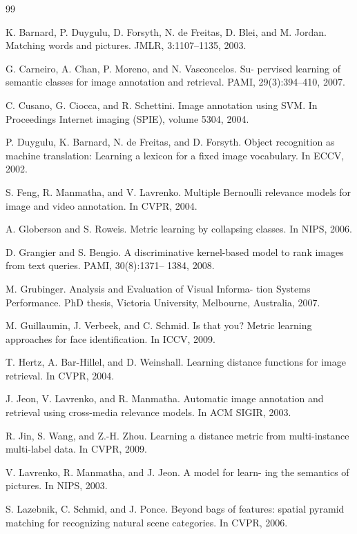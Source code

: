 \documentclass[a4paper,twocolumn]{ctexart}
\begin{document}
\begin{thebibliography} {99}

K. Barnard, P. Duygulu, D. Forsyth, N. de Freitas, D. Blei,
and M. Jordan. Matching words and pictures. JMLR,
3:1107–1135, 2003.

G. Carneiro, A. Chan, P. Moreno, and N. Vasconcelos. Su-
pervised learning of semantic classes for image annotation
and retrieval. PAMI, 29(3):394–410, 2007.

C. Cusano, G. Ciocca, and R. Schettini. Image annotation
using SVM. In Proceedings Internet imaging (SPIE), volume
5304, 2004.

P. Duygulu, K. Barnard, N. de Freitas, and D. Forsyth. Object
recognition as machine translation: Learning a lexicon for a
ﬁxed image vocabulary. In ECCV, 2002.

S. Feng, R. Manmatha, and V. Lavrenko. Multiple Bernoulli
relevance models for image and video annotation. In CVPR,
2004.

A. Globerson and S. Roweis. Metric learning by collapsing
classes. In NIPS, 2006.

D. Grangier and S. Bengio. A discriminative kernel-based
model to rank images from text queries. PAMI, 30(8):1371–
1384, 2008.

M. Grubinger. Analysis and Evaluation of Visual Informa-
tion Systems Performance. PhD thesis, Victoria University,
Melbourne, Australia, 2007.

M. Guillaumin, J. Verbeek, and C. Schmid. Is that you?
Metric learning approaches for face identiﬁcation. In ICCV,
2009.

T. Hertz, A. Bar-Hillel, and D. Weinshall. Learning distance
functions for image retrieval. In CVPR, 2004.

J. Jeon, V. Lavrenko, and R. Manmatha. Automatic image
annotation and retrieval using cross-media relevance models.
In ACM SIGIR, 2003.

R. Jin, S. Wang, and Z.-H. Zhou. Learning a distance metric
from multi-instance multi-label data. In CVPR, 2009.

V. Lavrenko, R. Manmatha, and J. Jeon. A model for learn-
ing the semantics of pictures. In NIPS, 2003.

S. Lazebnik, C. Schmid, and J. Ponce. Beyond bags of
features: spatial pyramid matching for recognizing natural
scene categories. In CVPR, 2006.


\end{thebibliography}
\end{document}

